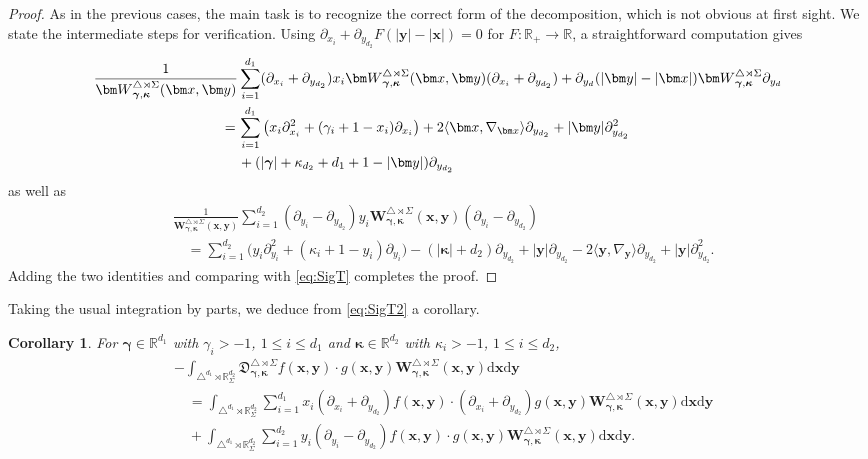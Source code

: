 \documentclass{amsart}
\newtheorem{cor}[thm]{Corollary}
\theoremstyle{remark}
\def\la{{\langle}}
\def\ra{{\rangle}}
\def\d{\mathrm{d}}
\def\fD{{\mathfrak D}}
\def\g{{\gamma}}
\def\k{{\kappa}}
\def\la{{\langle}}
\def\ra{{\rangle}}
\def\xb{{\bm x}}
\def\yb{{\bm y}}
\def\Wb{{\bm W}}
\def\RR{{\mathbb R}}
\def\bg{{\boldsymbol{\gamma}}}
\def\bk{{\boldsymbol{\kappa}}}
\begin{document}
\begin{proof}
As in the previous cases, the main task is to recognize the correct form of the decomposition, which is not obvious 
at first sight. We state the intermediate steps for verification. Using $\partial_{x_i}+ \partial_{y_{d_2}} F(|\yb|-|\xb|) = 0$
for $F: \RR_+ \to \RR$, a straightforward computation gives
\begin{align*}
 \frac{1}{\Wb_{\bg,\bk}^{\triangle \rtimes \Sigma} (\xb,\yb)} &  \sum_{i=1}^{d_1} 
     (\partial_{x_i}+ \partial_{y_{d_2}} )  x_i \Wb_{\bg,\bk}^{\triangle \rtimes \Sigma} (\xb,\yb) (\partial_{x_i}+ \partial_{y_{d_2}})  
       + \partial_{y_d} (|\yb|- |\xb|)  \Wb_{\bg,\bk}^{\triangle \rtimes \Sigma} \partial_{y_d}\\ 
       = \,&  \sum_{i=1}^{d_1} \left(x_i \partial_{x_i}^2 + (\g_i +1- x_i) \partial_{x_i} \right)  
      + 2 \la \xb, \nabla_{\xb} \ra \partial_{y_{d_2}} + |\yb| \partial_{y_{d_2}}^2 \notag \\
     & + (|\bg| + \k_{d_2} + d_1 +1 -|\yb|) \partial_{y_{d_2}} \notag
\end{align*}
as well as 
\begin{align*}
 & \frac{1}{\Wb_{\bg,\bk}^{\triangle \rtimes \Sigma} (\xb,\yb)}  \sum_{i=1}^{d_2} (\partial_{y_i} - \partial_{y_{d_2}}) 
       y_i  \Wb_{\bg,\bk}^{\triangle \rtimes \Sigma} (\xb,\yb)  (\partial_{y_i} - \partial_{y_{d_2}}) \\
  &\quad = \sum_{i=1}^{d_2} \big( y_i \partial_{y_i}^2 + (\k_i+1-y_i) \partial_{y_i} \big) -( |\bk|+d_2) \partial_{y_{d_2}} +|\yb|\partial_{y_{d_2}}
      -2 \la \yb, \nabla_{\yb} \ra \partial_{y_{d_2}} + |\yb| \partial_{y_{d_2}}^2.
\end{align*}
Adding the two identities and comparing with \eqref{eq:SigT} completes the proof. 
\end{proof}

Taking the usual integration by parts,  we deduce from \eqref{eq:SigT2} a corollary. 

\begin{cor}
For $\bg \in \RR^{d_1}$ with $\g_i  > -1$, $1\le i \le d_1$ and $\bk \in \RR^{d_2}$ with $\k_i > -1$, $1 \le i \le d_2$, 
\begin{align*}
 & -  \int_{\triangle^{d_1} \rtimes \RR_\Sigma^{d_2}}  \fD_{\bg,\bk}^{\triangle \rtimes \Sigma} f(\xb,\yb) \cdot g(\xb,\yb) 
    \Wb_{\bg,\bk}^{\triangle \rtimes \Sigma}(\xb,\yb)  \d \xb \d \yb\\
&\quad =  \int_{\triangle^{d_1} \rtimes \RR_\Sigma^{d_2}}  \sum_{i=1}^{d_1} x_i (\partial_{x_i}+ \partial_{y_{d_2}} ) f(\xb,\yb) \cdot  (\partial_{x_i}+ \partial_{y_{d_2}} ) g(\xb,\yb)  \Wb_{\bg,\bk}^{\triangle \rtimes \Sigma}(\xb,\yb)  \d \xb \d \yb\\ 
&\quad  +   \int_{\triangle^{d_1} \rtimes \RR_\Sigma^{d_2}}  \sum_{i=1}^{d_2}  y_i (\partial_{y_i} - \partial_{y_{d_2}}) f(\xb,\yb) \cdot  g(\xb,\yb) 
 \Wb_{\bg,\bk}^{\triangle \rtimes \Sigma}(\xb,\yb)  \d \xb \d \yb.
 \end{align*}
 \end{cor}
\fi
\end{document}
